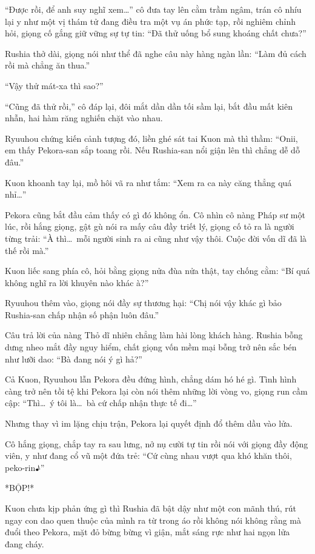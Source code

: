 \documentclass[../main.tex]{subfiles}
\begin{document}
``Được rồi, để anh suy nghĩ xem\dots'' cô đưa tay lên cằm trầm ngâm, trán cô nhíu lại y như một vị thám tử đang điều tra một vụ án phức tạp, rồi nghiêm chỉnh hỏi, giọng cố gắng giữ vững sự tự tin: ``Đã thử uống bổ sung khoáng chất chưa?''

Rushia thở dài, giọng nói như thể đã nghe câu này hàng ngàn lần: ``Làm đủ cách rồi mà chẳng ăn thua.''

``Vậy thử mát-xa thì sao?''

``Cũng đã thử rồi,'' cô đáp lại, đôi mắt dần dần tối sầm lại, bắt đầu mất kiên nhẫn, hai hàm răng nghiến chặt vào nhau.

Ryuuhou chứng kiến cảnh tượng đó, liền ghé sát tai Kuon mà thì thầm: ``Onii, em thấy Pekora-san sắp toang rồi. Nếu Rushia-san nổi giận lên thì chẳng dễ dỗ đâu.''

Kuon khoanh tay lại, mồ hôi vã ra như tắm: ``Xem ra ca này căng thẳng quá nhỉ\dots''

Pekora cũng bắt đầu cảm thấy có gì đó không ổn. Cô nhìn cô nàng Pháp sư một lúc, rồi hắng giọng, gật gù nói ra mấy câu đầy triết lý, giọng cố tỏ ra là người từng trải: ``À thì\dots\ mỗi người sinh ra ai cũng như vậy thôi. Cuộc đời vốn dĩ đã là thế rồi mà.''

Kuon liếc sang phía cô, hỏi bằng giọng nửa đùa nửa thật, tay chống cằm: ``Bí quá không nghĩ ra lời khuyên nào khác à?''

Ryuuhou thêm vào, giọng nói đầy sự thương hại: ``Chị nói vậy khác gì bảo Rushia-san chấp nhận số phận luôn đâu.''

Câu trả lời của nàng Thỏ dĩ nhiên chẳng làm hài lòng khách hàng. Rushia bỗng dưng nheo mắt đầy nguy hiểm, chất giọng vốn mềm mại bỗng trở nên sắc bén như lưỡi dao: ``Bà đang nói ý gì hả?''

Cả Kuon, Ryuuhou lẫn Pekora đều đứng hình, chẳng dám hó hé gì. Tình hình càng trở nên tồi tệ khi Pekora lại còn nói thêm những lời vòng vo, giọng run cầm cập: ``Thì\dots\ ý tôi là\dots\ bà cứ chấp nhận thực tế đi\dots''

Nhưng thay vì im lặng chịu trận, Pekora lại quyết định đổ thêm dầu vào lửa.

Cô hắng giọng, chắp tay ra sau lưng, nở nụ cười tự tin rồi nói với giọng đầy động viên, y như đang cổ vũ một đứa trẻ: ``Cứ cùng nhau vượt qua khó khăn thôi, peko-rin♪''

*BỘP!*

Kuon chưa kịp phản ứng gì thì Rushia đã bật dậy như một con mãnh thú, rút ngay con dao quen thuộc của mình ra từ trong áo rồi không nói không rằng mà đuổi theo Pekora, mặt đỏ bừng bừng vì giận, mắt sáng rực như hai ngọn lửa đang cháy.
\end{document}
